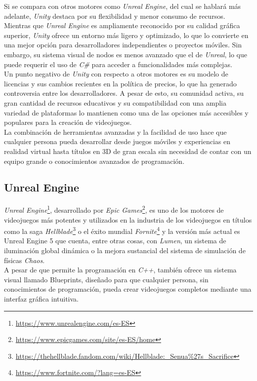 Si se compara con otros motores como \textit{Unreal Engine}, del cual se hablará más adelante, \textit{Unity} destaca por su flexibilidad y menor consumo de recursos. Mientras que \textit{Unreal Engine} es ampliamente reconocido por su calidad gráfica superior, \textit{Unity} ofrece un entorno más ligero y optimizado, lo que lo convierte en una mejor opción para desarrolladores independientes o proyectos móviles. Sin embargo, su sistema visual de nodos es menos avanzado que el de \textit{Unreal}, lo que puede requerir el uso de \textit{C\#} para acceder a funcionalidades más complejas.\\

Un punto negativo de \textit{Unity} con respecto a otros motores es su modelo de licencias y sus cambios recientes en la política de precios, lo que ha generado controversia entre los desarrolladores. A pesar de esto, su comunidad activa, su gran cantidad de recursos educativos y su compatibilidad con una amplia variedad de plataformas lo mantienen como una de las opciones más accesibles y populares para la creación de videojuegos.\\

La combinación de herramientas avanzadas y la facilidad de uso hace que cualquier persona pueda desarrollar desde juegos móviles y experiencias en realidad virtual hasta títulos en 3D de gran escala sin necesidad de contar con un equipo grande o conocimientos avanzados de programación.

\subsection{Unreal Engine}
\textit{Unreal Engine}\footnote{\url{https://www.unrealengine.com/es-ES}}, desarrollado por \textit{Epic Games}\footnote{\url{https://www.epicgames.com/site/es-ES/home}}, es uno de los motores de videojuegos más potentes y utilizados en la industria de los videojuegos en títulos como la saga \textit{Hellblade}\footnote{\url{https://thehellblade.fandom.com/wiki/Hellblade:_Senua\%27s_Sacrifice}} o el éxito mundial \textit{Fornite}\footnote{\url{https://www.fortnite.com/?lang=es-ES}} y la versión más actual es Unreal Engine 5 que cuenta, entre otras cosas, con \textit{Lumen}, un sistema de iluminación global dinámica o la mejora sustancial del sistema de simulación de físicas \textit{Chaos}.\\

A pesar de que permite la programación en \textit{C++}, también ofrece un sistema visual llamado Blueprints, diseñado para que cualquier persona, sin conocimientos de programación, pueda crear videojuegos completos mediante una interfaz gráfica intuitiva.\\

